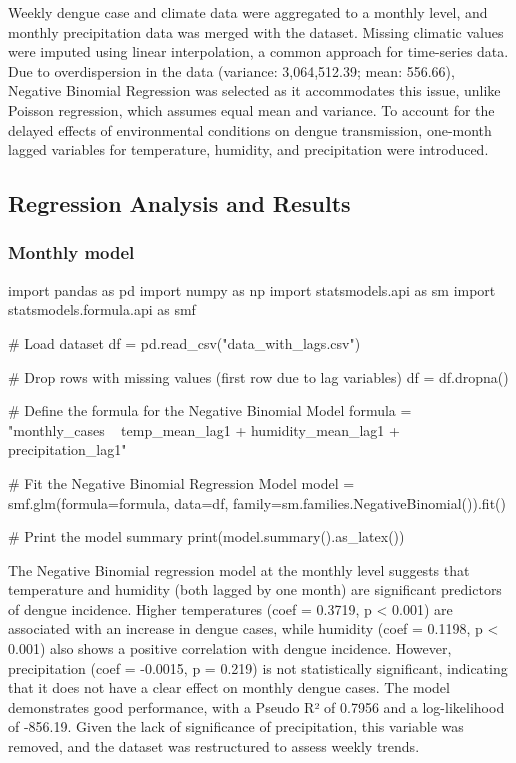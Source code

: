 \documentclass{article}
\begin{document}
Weekly dengue case and climate data were aggregated to a monthly level, and monthly precipitation data was merged with the dataset. Missing climatic values were imputed using linear interpolation, a common approach for time-series data. Due to overdispersion in the data (variance: 3,064,512.39; mean: 556.66), Negative Binomial Regression was selected as it accommodates this issue, unlike Poisson regression, which assumes equal mean and variance. To account for the delayed effects of environmental conditions on dengue transmission, one-month lagged variables for temperature, humidity, and precipitation were introduced.


\subsection*{Regression Analysis and Results}

\subsubsection*{Monthly model}

\begin{pycode}
import pandas as pd
import numpy as np
import statsmodels.api as sm
import statsmodels.formula.api as smf

# Load dataset
df = pd.read_csv("data_with_lags.csv") 

# Drop rows with missing values (first row due to lag variables)
df = df.dropna()

# Define the formula for the Negative Binomial Model
formula = "monthly_cases ~ temp_mean_lag1 + humidity_mean_lag1 + precipitation_lag1"

# Fit the Negative Binomial Regression Model
model = smf.glm(formula=formula, data=df, family=sm.families.NegativeBinomial()).fit()

# Print the model summary
print(model.summary().as_latex())

\end{pycode}

The Negative Binomial regression model at the monthly level suggests that temperature and humidity (both lagged by one month) are significant predictors of dengue incidence. Higher temperatures (coef = 0.3719, p < 0.001) are associated with an increase in dengue cases, while humidity (coef = 0.1198, p < 0.001) also shows a positive correlation with dengue incidence. However, precipitation (coef = -0.0015, p = 0.219) is not statistically significant, indicating that it does not have a clear effect on monthly dengue cases. The model demonstrates good performance, with a Pseudo R² of 0.7956 and a log-likelihood of -856.19. Given the lack of significance of precipitation, this variable was removed, and the dataset was restructured to assess weekly trends.
\end{document}
